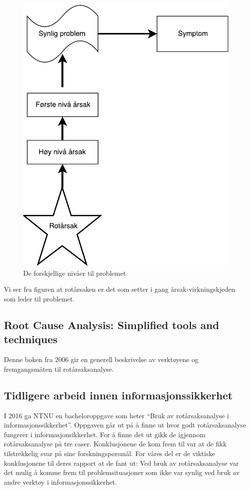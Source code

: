 \begin{figure}[H]
    \centering
    \includegraphics[scale=0.6]{main/bilder/nivaa.pdf}
    \caption[Nivåer av årsaker]{De forskjellige nivåer til problemet}
    \label{fig:nivaa}
\end{figure}

Vi ser fra figuren at rotårsaken er det som setter i gang årsak-virkningskjeden som leder til problemet. 

\subsection{Root Cause Analysis: Simplified tools and techniques}
Denne boken fra 2006 gir en generell beskrivelse av verktøyene og fremgangsmåten til rotårsaksanalyse. 

\subsection{Tidligere arbeid innen informasjonssikkerhet}
I 2016 ga NTNU en bacheloroppgave som heter ``Bruk av rotårsaksanalyse i informasjonssikkerhet''\cite{RCARapport}. Oppgaven går ut på å finne ut hvor godt rotårsaksanalyse fungerer i informasjonsikkerhet. For å finne det ut gikk de igjennom rotårsaksanalyse på tre caser. Konklusjonene de kom frem til var at de fikk tilstrekkelig svar på sine forskningspørsmål. For våres del er de viktiske konklusjonene til deres rapport\cite{RCARapport} at de fant ut: Ved bruk av rotårsaksanalyse var det mulig å komme frem til problemsituasjoner som ikke var synlig ved bruk av andre verktøy i informasjonssikkerhet.  

